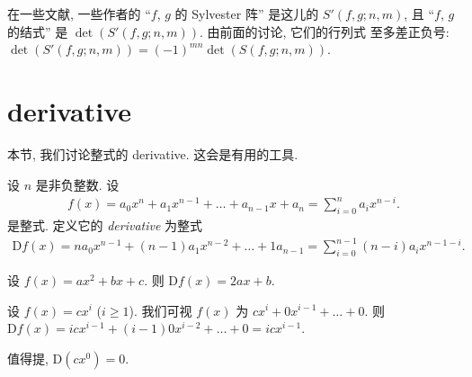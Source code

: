 \documentclass[../libro.tex]{subfiles}
\begin{document}
\begin{example}
    在一些文献, 一些作者的
    ``\(f\), \(g\) 的 Sylvester 阵'' 是这儿的
    \(S'(f, g; n, m)\),
    且 ``\(f\), \(g\) 的结式'' 是
    \(\det {(S'(f, g; n, m))}\).
    由前面的讨论, 它们的行列式%
    至多差正负号:
    \(\det {(S'(f, g; n, m))}
    = (-1)^{m n} \det {(S(f, g; n, m))}\).
\end{example}

\section{derivative}

本节, 我们讨论整式的 derivative.
这会是有用的工具.

\begin{definition}
    设 \(n\) 是非负整数.
    设
    \begin{align*}
        f(x) = a_0 x^n + a_1 x^{n-1} + \dots + a_{n-1} x + a_n
        = \sum_{i = 0}^{n} {a_i x^{n-i}}.
    \end{align*}
    是整式.
    定义它的 \emph{derivative} 为整式
    \begin{align*}
        \mathrm{D} f(x)
        = n a_0 x^{n-1} + (n-1) a_1 x^{n-2} + \dots + 1 a_{n-1}
        = \sum_{i = 0}^{n-1} {(n-i) a_i x^{n-1-i}}.
    \end{align*}
\end{definition}

\begin{example}
    设 \(f(x) = a x^2 + b x + c\).
    则 \(\mathrm{D} f(x) = 2 a x + b\).
\end{example}

\begin{example}
    设 \(f(x) = c x^i\) (\(i \geq 1\)).
    我们可视 \(f(x)\) 为 \(c x^i + 0 x^{i-1} + \dots + 0\).
    则 \(\mathrm{D} f(x)
        = i c x^{i-1} + (i-1) 0 x^{i-2} + \dots + 0
    = i c x^{i-1}\).

    值得提, \(\mathrm{D} (c x^0) = 0\).
\end{example}
\end{document}
